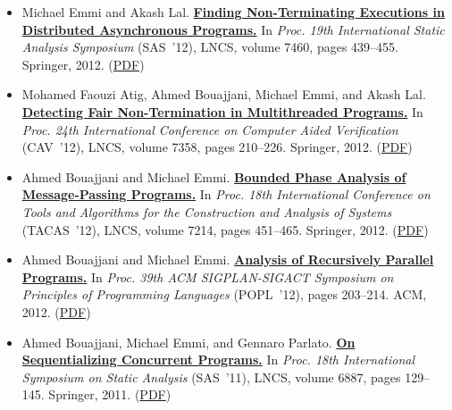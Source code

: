 \documentclass{article}
\begin{document}
\begin{itemize}[leftmargin=0cm,label={}]
    \item Michael Emmi and Akash Lal. {\bf\href{%
    http://dx.doi.org/10.1007/978-3-642-33125-1_29}{%
    Finding Non-Terminating Executions in Distributed Asynchronous Programs.}} In \emph{ Proc. 19th International Static Analysis Symposium } (SAS ’12), LNCS, volume 7460, pages 439–455. Springer, 2012. (\href{https://michael-emmi.github.io/https://github.com/michael-emmi/research-papers/raw/master/conf-sas-EmmiL12.pdf}{PDF})


    \item Mohamed Faouzi Atig, Ahmed Bouajjani, Michael Emmi, and Akash Lal. {\bf\href{%
    http://dx.doi.org/10.1007/978-3-642-31424-7_19}{%
    Detecting Fair Non-Termination in Multithreaded Programs.}} In \emph{ Proc. 24th International Conference on Computer Aided Verification } (CAV ’12), LNCS, volume 7358, pages 210–226. Springer, 2012. (\href{https://michael-emmi.github.io/https://github.com/michael-emmi/research-papers/raw/master/conf-cav-AtigBEL12.pdf}{PDF})


    \item Ahmed Bouajjani and Michael Emmi. {\bf\href{%
    http://dx.doi.org/10.1007/978-3-642-28756-5_31}{%
    Bounded Phase Analysis of Message-Passing Programs.}} In \emph{ Proc. 18th International Conference on Tools and Algorithms for the Construction and Analysis of Systems } (TACAS ’12), LNCS, volume 7214, pages 451–465. Springer, 2012. (\href{https://michael-emmi.github.io/https://github.com/michael-emmi/research-papers/raw/master/conf-tacas-BouajjaniE12.pdf}{PDF})


    \item Ahmed Bouajjani and Michael Emmi. {\bf\href{%
    http://doi.acm.org/10.1145/2103656.2103681}{%
    Analysis of Recursively Parallel Programs.}} In \emph{ Proc. 39th ACM SIGPLAN-SIGACT Symposium on Principles of Programming Languages } (POPL ’12), pages 203–214. ACM, 2012. (\href{https://michael-emmi.github.io/https://github.com/michael-emmi/research-papers/raw/master/conf-popl-BouajjaniE12.pdf}{PDF})


    \item Ahmed Bouajjani, Michael Emmi, and Gennaro Parlato. {\bf\href{%
    http://dx.doi.org/10.1007/978-3-642-23702-7_13}{%
    On Sequentializing Concurrent Programs.}} In \emph{ Proc. 18th International Symposium on Static Analysis } (SAS ’11), LNCS, volume 6887, pages 129–145. Springer, 2011. (\href{https://michael-emmi.github.io/https://github.com/michael-emmi/research-papers/raw/master/conf-sas-BouajjaniEP11.pdf}{PDF})



\end{itemize}
\end{document}
